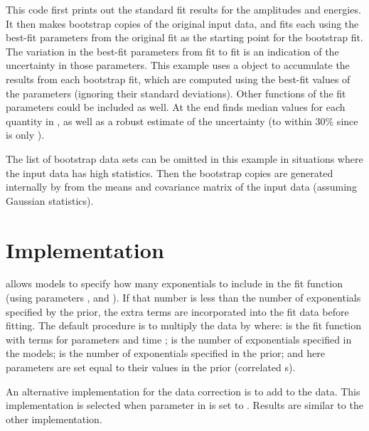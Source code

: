 \documentclass[letterpaper,10pt,english]{sphinxmanual}
\begin{document}
This code first prints out the standard fit results for the  amplitudes
and  energies. It then makes  bootstrap copies of the original
input data, and fits each using the best-fit parameters from the original fit
as the starting point for the bootstrap fit. The variation in the best-fit
parameters from fit to fit is an indication of the uncertainty in those
parameters. This example uses a  object  to
accumulate the results from each bootstrap fit, which are computed using the
best-fit values of the parameters (ignoring their standard deviations). Other
functions of the fit parameters could be included as well. At the end
 finds median values for each quantity in
, as well as a robust estimate of the uncertainty (to within 30\% since
 is only ).

The list of bootstrap data sets  can be omitted in this example
in situations where the input data has high statistics. Then the bootstrap
copies are generated internally by  from the
means and covariance matrix of the input data (assuming Gaussian statistics).


\section{Implementation}
\label{corrfitter:implementation}
{\hyperref[corrfitter:corrfitter.CorrFitter]{}} allows models to specify how many exponentials to include in the
fit function (using parameters ,  and ). If that
number is less than the number of exponentials specified by the prior, the
extra terms are incorporated into the fit data before fitting. The default
procedure is to multiply the data by  where:
 is the fit function with  terms for parameters  and
time ;  is the number of exponentials specified in the models;
 is the number of exponentials specified in the prior; and here
parameters  are set equal to their values in the prior (correlated
s).

An alternative implementation for the data correction is to add
 to the data. This implementation is selected
when parameter  in {\hyperref[corrfitter:corrfitter.CorrFitter]{}} is set to . Results are
similar to the other implementation.
\end{document}
